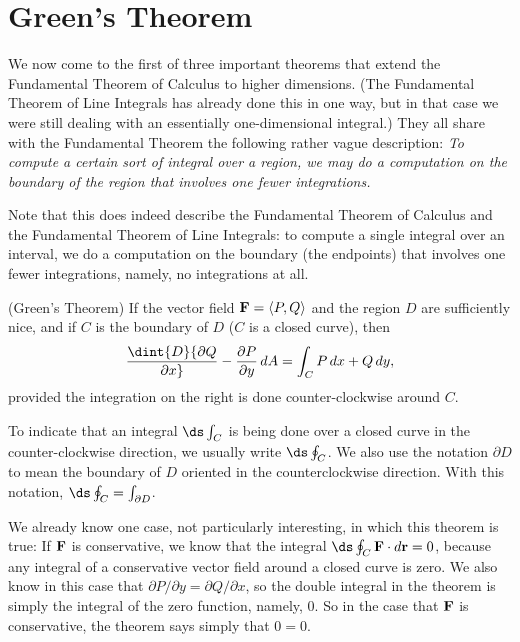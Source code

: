 \section{Green's Theorem}{}{}
\nobreak
We now come to the first of three important theorems that extend the
Fundamental Theorem of Calculus to higher dimensions. (The Fundamental
Theorem of Line Integrals has already done this in one way, but in
that case we were still dealing with an essentially one-dimensional
integral.) They all share with the Fundamental Theorem the following
rather vague description: {\it To compute a certain sort of integral over a
region, we may do a computation on the boundary of the region
that involves one fewer integrations.}

Note that this does indeed describe the Fundamental Theorem of
Calculus and the Fundamental Theorem of Line Integrals: to
compute a single integral over an interval, we do a computation on the
boundary (the endpoints) that involves one fewer integrations, namely,
no integrations at all.

\begin{theorem} (Green's Theorem) If the vector field ${\bf F}=\langle
P,Q\rangle$ and the region $D$ are sufficiently nice, and if $C$ is
the boundary of $D$ ($C$ is a closed curve), then
$$\dint{D} {\partial Q\over\partial x}
-{\partial P\over\partial y} \,dA = \int_C P\,dx +Q\,dy ,$$
provided the integration on the right is done counter-clockwise around
$C$.\end{theorem} 
\label{thm:greens theorem}

To indicate that an integral $\ds\int_C$ is being done over a closed
curve in the counter-clockwise direction, we usually write
$\ds\oint_C$. We also use the notation $\partial D$ to mean the
boundary of $D$ {\dfont oriented\/} in the
counterclockwise direction. With this notation,
$\ds\oint_C=\int_{\partial D}$.

We already know one case, not particularly interesting, in which this
theorem is true: If $\bf F$ is conservative, we know that the integral
$\ds\oint_C {\bf F}\cdot d{\bf r}=0$, because any integral of a
conservative vector field around a closed curve is zero. We also know
in this case that $\partial P/\partial y=\partial Q/\partial x$, so
the double integral  in the theorem is simply the integral of the zero
function, namely, 0. So in the case that $\bf F$ is conservative, the
theorem says simply that $0=0$. 

